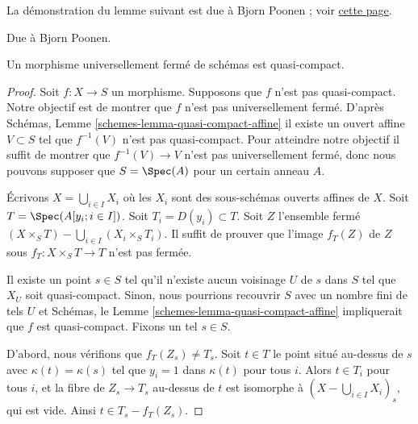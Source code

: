 \noindent
La démonstration du lemme suivant est due à Bjorn Poonen ; voir
\href{https://mathoverflow.net/questions/23337/is-a-universally-closed-morphism-of-schemes-quasi-compact/23528#23528}{cette page}.

\begin{lemma}
\label{lemma-universally-closed-quasi-compact}
\begin{reference}
Due à Bjorn Poonen.
\end{reference}
Un morphisme universellement fermé de schémas est quasi-compact.
\end{lemma}

\begin{proof}
Soit $f : X \to S$ un morphisme. Supposons que $f$ n'est pas quasi-compact.
Notre objectif est de montrer que $f$ n'est pas universellement
fermé. D'après Schémas, Lemme \ref{schemes-lemma-quasi-compact-affine} il existe
un ouvert affine $V \subset S$ tel que $f^{-1}(V)$ n'est pas quasi-compact.
Pour atteindre notre objectif il suffit de montrer que $f^{-1}(V) \to V$
n'est pas universellement fermé, donc nous pouvons supposer que $S = \Spec(A)$
pour un certain anneau $A$.

\medskip\noindent
Écrivons $X = \bigcup_{i \in I} X_i$ où les $X_i$ sont des sous-schémas
ouverts affines de $X$. Soit
$T = \Spec(A[y_i ; i \in I])$. Soit $T_i = D(y_i) \subset T$. Soit $Z$
l'ensemble fermé $(X \times_S T) - \bigcup_{i \in I} (X_i \times_S T_i)$. Il suffit de prouver que
l'image $f_T(Z)$ de $Z$ sous $f_T : X \times_S T \to T$ n'est pas
fermée.

\medskip\noindent Il
existe un point $s \in S$ tel qu'il n'existe aucun voisinage
$U$ de $s$ dans $S$ tel que $X_U$ soit quasi-compact.
Sinon, nous pourrions recouvrir $S$ avec un nombre fini
de tels $U$ et Schémas, le Lemme \ref{schemes-lemma-quasi-compact-affine} impliquerait
que $f$ est quasi-compact. Fixons un tel $s \in S$.

\medskip\noindent
D'abord, nous vérifions que $f_T(Z_s) \ne T_s$. Soit $t \in T$ le point situé
au-dessus de $s$ avec $\kappa(t) = \kappa(s)$ tel que $y_i = 1$ dans
$\kappa(t)$ pour tous
$i$. Alors $t \in T_i$ pour tous $i$, et la fibre de
$Z_s \to T_s$ au-dessus de $t$ est isomorphe à $(X - \bigcup_{i \in I} X_i)_s$, qui est
vide. Ainsi $t \in T_s - f_T(Z_s)$.


\end{proof}
